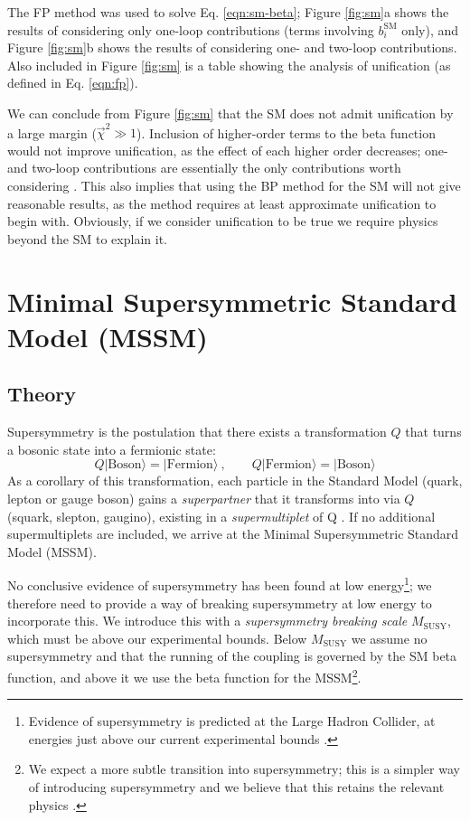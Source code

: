 \documentclass[12pt,a4paper,oneside]{article}
\begin{document}
The FP method was used to solve Eq. \ref{eqn:sm-beta}; Figure \ref{fig:sm}a shows the results of considering only one-loop contributions (terms involving $b_i^\mathrm{SM}$ only), and Figure \ref{fig:sm}b shows the results of considering one- and two-loop contributions. Also included in Figure \ref{fig:sm} is a table showing the analysis of unification (as defined in Eq. \ref{eqn:fp}).

We can conclude from Figure \ref{fig:sm} that the SM does not admit unification by a large margin ($\overrightarrow{\chi}^2 \gg 1$). Inclusion of higher-order terms to the beta function would not improve unification, as the effect of each higher order decreases; one- and two-loop contributions are essentially the only contributions worth considering \cite{amaldi}. This also implies that using the BP method for the SM will not give reasonable results, as the method requires at least approximate unification to begin with. Obviously, if we consider unification to be true we require physics beyond the SM to explain it.

\section{Minimal Supersymmetric Standard Model (MSSM)}
\label{sec:mssm}

\subsection{Theory}

Supersymmetry is the postulation that there exists a transformation $Q$ that turns a bosonic state into a fermionic state:
\[
Q \vert{\mathrm{Boson}}\rangle = \vert{\mathrm{Fermion}}\rangle \:, \quad\quad Q \vert{\mathrm{Fermion}}\rangle = \vert{\mathrm{Boson}}\rangle
\]
As a corollary of this transformation, each particle in the Standard Model (quark, lepton or gauge boson) gains a \textit{superpartner} that it transforms into via $Q$ (squark, slepton, gaugino), existing in a \textit{supermultiplet} of Q \cite{mssm}. If no additional supermultiplets are included, we arrive at the Minimal Supersymmetric Standard Model (MSSM).

No conclusive evidence of supersymmetry has been found at low energy\footnote{Evidence of supersymmetry is predicted at the Large Hadron Collider, at energies just above our current experimental bounds \cite{mssm-lhc}.}; we therefore need to provide a way of breaking supersymmetry at low energy to incorporate this. We introduce this with a \textit{supersymmetry breaking scale} $M_\mathrm{SUSY}$, which must be above our experimental bounds. Below $M_\mathrm{SUSY}$ we assume no supersymmetry and that the running of the coupling is governed by the SM beta function, and above it we use the beta function for the MSSM\footnote{We expect a more subtle transition into supersymmetry; this is a simpler way of introducing supersymmetry and we believe that this retains the relevant physics \cite{amaldi}.}. 
\end{document}
